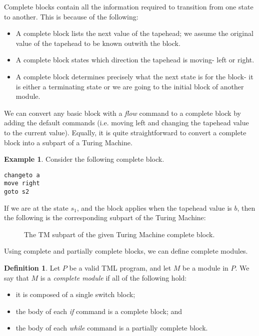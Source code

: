 \documentclass{amsart}
\theoremstyle{definition}
\newtheorem{definition}[theorem]{Definition}
\newtheorem{example}[theorem]{Example}
\begin{document}
    Complete blocks contain all the information required to transition from one state to another. This is because of the following:
    \begin{itemize}
        \item A complete block lists the next value of the tapehead; we assume the original value of the tapehead to be known outwith the block.
        \item A complete block states which direction the tapehead is moving- left or right.
        \item A complete block determines precisely what the next state is for the block- it is either a terminating state or we are going to the initial block of another module.
    \end{itemize}        
    We can convert any basic block with a \textit{flow} command to a complete block by adding the default commands (i.e. moving left and changing the tapehead value to the current value). Equally, it is quite straightforward to convert a complete block into a subpart of a Turing Machine.
    \begin{example}
        Consider the following complete block.
\begin{lstlisting}[language=TML]
changeto a
move right
goto s2
\end{lstlisting}
        \noindent If we are at the state $s_1$, and the block applies when the tapehead value is $b$, then the following is the corresponding subpart of the Turing Machine:
        \begin{figure}[H]
            \centering
            \caption{The TM subpart of the given Turing Machine complete block.}
        \end{figure}            
    \end{example}
    
    Using complete and partially complete blocks, we can define complete modules.
    \begin{definition}
        Let $P$ be a valid TML program, and let $M$ be a module in $P$. We say that $M$ is a \emph{complete module} if all of the following hold:
        \begin{itemize}
            \item it is composed of a single switch block;
            \item the body of each \textit{if} command is a complete block; and
            \item the body of each \textit{while} command is a partially complete block.
        \end{itemize}
    \end{definition}
\end{document}
